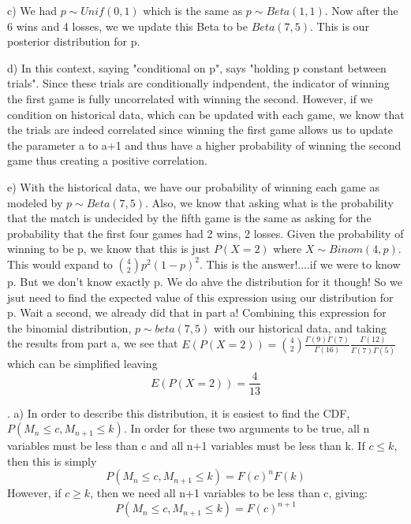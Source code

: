 \documentclass[11pt]{article}
\begin{document}
\smallskip
	c) We had $p \sim Unif(0,1)$ which is the same as $p \sim Beta(1,1)$.  Now after the 6 wins and 4 losses, we we update this Beta to be $Beta(7,5)$.  This is our posterior distribution for p. 
\smallskip

	d) In this context, saying "conditional on p", says "holding p constant between trials".  Since these trials are conditionally indpendent, the indicator of winning the first game is fully uncorrelated with winning the second.  However, if we condition on historical data, which can be updated with each game, we know that the trials are indeed correlated since winning the first game allows us to update the parameter a to a+1 and thus have a higher probability of winning the second game thus creating a positive correlation.

\smallskip

	e) With the historical data, we have our probability of winning each game as modeled by $p\sim Beta(7,5)$. Also, we know that asking what is the probability that the match is undecided by the fifth game is the same as asking for the probability that the first four games had 2 wins, 2 losses.  Given the probability of winning to be p, we know that this is just $P(X=2)$ where $X \sim Binom(4,p)$.  This would expand to $\binom{4}{2}p^2(1-p)^2$.  This is the answer!....if we were to know p.  But we don't know exactly p.  We do ahve the distribution for it though! So we jsut need to find the expected value of this expression using our distribution for p.  Wait a second, we already did that in part a!  Combining this expression for the binomial distribution, $p \sim beta(7,5)$ with our historical data, and taking the results from part a, we see that 
	$E(P(X=2)) = \binom{4}{2} \frac{\Gamma(9)\Gamma(7)}{\Gamma(16)}\frac{\Gamma(12)}{\Gamma(7)\Gamma(5)}$ which can be simplified leaving
	$$\boxed{E(P(X=2)) = \frac{4}{13}}$$

\bigskip

. 
    a) In order to describe this distribution, it is easiest to find the CDF, $P(M_n \le c, M_{n+1}\le k) $. In order for these two arguments to be true, all n variables must be less than c and all n+1 variables must be less than k.  If $c\le k$, then this is simply $$P(M_n \le c, M_{n+1}\le k) = F(c)^nF(k)$$
    However, if $c\ge k$, then we need all n+1 variables to be less than c, giving:
    $$P(M_n \le c, M_{n+1}\le k) = F(c)^{n+1}$$
\smallskip
\end{document}

